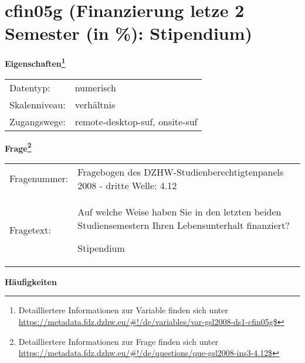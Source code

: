 
    \setcounter{footnote}{0}

    \vspace*{-1.8cm}
	\section{cfin05g (Finanzierung letze 2 Semester (in \%): Stipendium)}
	\label{section:cfin05g}



    \vspace*{0.5cm}
    \noindent\textbf{Eigenschaften\footnote{Detailliertere Informationen zur Variable finden sich unter
		\url{https://metadata.fdz.dzhw.eu/\#!/de/variables/var-gsl2008-ds1-cfin05g$}}}\\
	\begin{tabularx}{\hsize}{@{}lX}
	Datentyp: & numerisch \\
	Skalenniveau: & verhältnis \\
	Zugangswege: &
	  remote-desktop-suf, 
	  onsite-suf
 \\
    \end{tabularx}



				\vspace*{0.5cm}
                \noindent\textbf{Frage\footnote{Detailliertere Informationen zur Frage finden sich unter
		              \url{https://metadata.fdz.dzhw.eu/\#!/de/questions/que-gsl2008-ins3-4.12$}}}\\
				\begin{tabularx}{\hsize}{@{}lX}
					Fragenummer: &
					  Fragebogen des DZHW-Studienberechtigtenpanels 2008 - dritte Welle:
					  4.12
 \\
					Fragetext: & Auf welche Weise haben Sie in den letzten beiden Studiensemestern Ihren Lebensunterhalt finanziert?\par  Stipendium \\
				\end{tabularx}





        		\vspace*{0.5cm}
                \noindent\textbf{Häufigkeiten}

